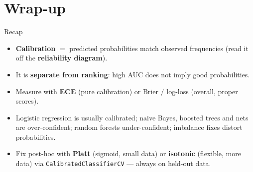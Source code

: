 \documentclass[aspectratio=169]{beamer}
\begin{document}
\section*{Wrap-up}

\begin{frame}{Recap}
  \begin{itemize}\small
    \item \textbf{Calibration} $=$ predicted probabilities match observed frequencies (read it
      off the \textbf{reliability diagram}).
    \item It is \textbf{separate from ranking}: high AUC does not imply good probabilities.
    \item Measure with \textbf{ECE} (pure calibration) or Brier / log-loss (overall, proper scores).
    \item Logistic regression is usually calibrated; naive Bayes, boosted trees and nets are
      over-confident; random forests under-confident; imbalance fixes distort probabilities.
    \item Fix post-hoc with \textbf{Platt} (sigmoid, small data) or \textbf{isotonic} (flexible,
      more data) via \texttt{CalibratedClassifierCV} --- always on held-out data.
  \end{itemize}
  \vfill
\end{frame}
\end{document}
